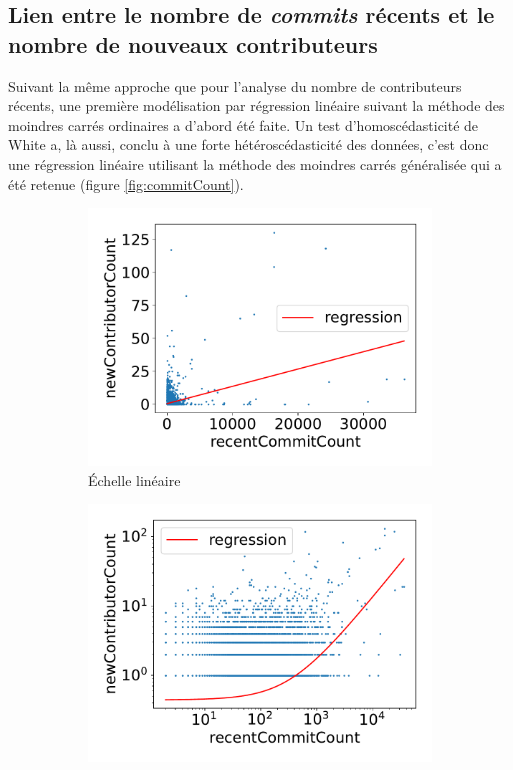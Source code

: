 \documentclass[dvipsnames]{llncs}
\newcommand{\en}[1]{\foreignlanguage{english}{\todo{fix weird hspace}\emph{#1}}}
\begin{document}
    \subsection{Lien entre le nombre de \en{commits} récents et le nombre de nouveaux contributeurs}

    Suivant la même approche que pour l'analyse du nombre de contributeurs récents, une première modélisation
    par régression linéaire suivant la méthode des moindres carrés ordinaires a d'abord été faite. Un test
    d'homoscédasticité de White a, là aussi, conclu à une forte hétéroscédasticité des données, c'est donc une
    régression linéaire utilisant la méthode des moindres carrés généralisée qui a été retenue (figure
    \ref{fig:commitCount}).

    \begin{figure}[ht]
        \centering
        \begin{subfigure}[t]{0.5\textwidth}
            \includegraphics[width=\textwidth]{../experiment/data_analysis/recentCommitCountRegression_linearScale}
            \caption{Échelle linéaire}
        \end{subfigure}%
        \begin{subfigure}[t]{0.5\textwidth}
            \includegraphics[width=\textwidth]{../experiment/data_analysis/recentCommitCountRegression_logScale}

\end{subfigure}
\end{figure}
\end{document}
